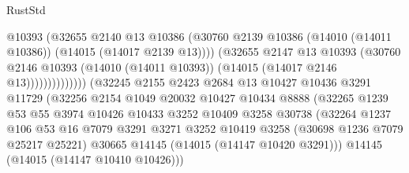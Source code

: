 \begin{lexlean}{RustStd}
\begin{coremodule}
                                          @10393
                                          (@32655
                                            @2140
                                            @13
                                            @10386
                                            (@30760
                                              @2139
                                              @10386
                                              (@14010 (@14011 @10386))
                                              (@14015 (@14017 @2139 @13))))
                                          (@32655
                                            @2147
                                            @13
                                            @10393
                                            (@30760
                                              @2146
                                              @10393
                                              (@14010 (@14011 @10393))
                                              (@14015 (@14017 @2146 @13))))))))))))))
                      (@32245
                        @2155
                        @2423
                        @2684
                        @13
                        @10427
                        @10436
                        @3291
                        @11729
                        (@32256
                          @2154
                          @1049
                          @20032
                          @10427
                          @10434
                          @8888
                          (@32265
                            @1239
                            @53
                            @55
                            @3974
                            @10426
                            @10433
                            @3252
                            @10409
                            @3258
                            @30738
                            (@32264
                              @1237
                              @106
                              @53
                              @16
                              @7079
                              @3291
                              @3271
                              @3252
                              @10419
                              @3258
                              (@30698 @1236 @7079 @25217 @25221)
                              @30665
                              @14145
                              (@14015 (@14147 @10420 @3291)))
                            @14145
                            (@14015 (@14147 @10410 @10426)))

\end{coremodule}
\end{lexlean}
